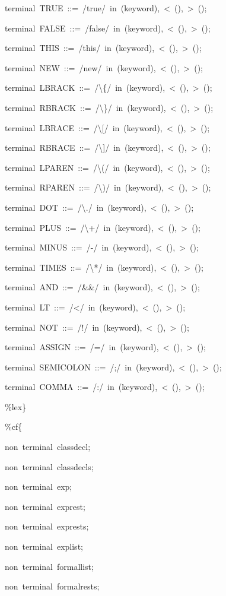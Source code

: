 \documentclass[12pt,english,twoside]{report}
\newenvironment{codeblock}
{\begin{list}{}{
\setlength{\rightmargin}{\leftmargin}
\setlength{\listparindent}{0pt}%
\raggedright
\setlength{\itemsep}{0pt}
\setlength{\parsep}{0pt}
\normalfont\ttfamily}%
 \item[]}
{\end{list}}
\begin{document}
\begin{codeblock}
\begin{codeblock}
terminal~TRUE~::=~/true/~in~(keyword),~<~(),~>~();

terminal~FALSE~::=~/false/~in~(keyword),~<~(),~>~();

terminal~THIS~::=~/this/~in~(keyword),~<~(),~>~();

terminal~NEW~::=~/new/~in~(keyword),~<~(),~>~();

terminal~LBRACK~::=~/\textbackslash{}\{/~in~(keyword),~<~(),~>~();

terminal~RBRACK~::=~/\textbackslash{}\}/~in~(keyword),~<~(),~>~();

terminal~LBRACE~::=~/\textbackslash{}{[}/~in~(keyword),~<~(),~>~();

terminal~RBRACE~::=~/\textbackslash{}]/~in~(keyword),~<~(),~>~();

terminal~LPAREN~::=~/\textbackslash{}(/~in~(keyword),~<~(),~>~();

terminal~RPAREN~::=~/\textbackslash{})/~in~(keyword),~<~(),~>~();

terminal~DOT~::=~/\textbackslash{}./~in~(keyword),~<~(),~>~();

terminal~PLUS~::=~/\textbackslash{}+/~in~(keyword),~<~(),~>~();

terminal~MINUS~::=~/-/~in~(keyword),~<~(),~>~();

terminal~TIMES~::=~/\textbackslash{}{*}/~in~(keyword),~<~(),~>~();

terminal~AND~::=~/\&\&/~in~(keyword),~<~(),~>~();

terminal~LT~::=~/</~in~(keyword),~<~(),~>~();

terminal~NOT~::=~/!/~in~(keyword),~<~(),~>~();

terminal~ASSIGN~::=~/=/~in~(keyword),~<~(),~>~();

terminal~SEMICOLON~::=~/;/~in~(keyword),~<~(),~>~();

terminal~COMMA~::=~/:/~in~(keyword),~<~(),~>~();
\end{codeblock}
\%lex\}

\%cf\{
\begin{codeblock}
non~terminal~classdecl;

non~terminal~classdecls;

non~terminal~exp;

non~terminal~exprest;

non~terminal~exprests;

non~terminal~explist;

non~terminal~formallist;

non~terminal~formalrests;


\end{codeblock}
\end{codeblock}
\end{document}
